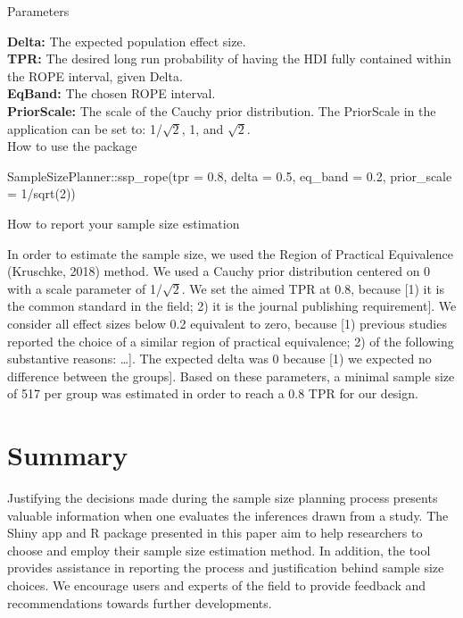 \documentclass[
  english,
  man,floatsintext]{apa6}
\newenvironment{Shaded}{\begin{snugshade}}{\end{snugshade}}
\newcommand{\AttributeTok}[1]{\textcolor[rgb]{0.77,0.63,0.00}{#1}}
\newcommand{\DecValTok}[1]{\textcolor[rgb]{0.00,0.00,0.81}{#1}}
\newcommand{\FloatTok}[1]{\textcolor[rgb]{0.00,0.00,0.81}{#1}}
\newcommand{\FunctionTok}[1]{\textcolor[rgb]{0.00,0.00,0.00}{#1}}
\newcommand{\NormalTok}[1]{#1}
\newcommand{\SpecialCharTok}[1]{\textcolor[rgb]{0.00,0.00,0.00}{#1}}
\begin{document}
Parameters

\textbf{Delta:} The expected population effect size.\\
\textbf{TPR:} The desired long run probability of having the HDI fully contained within the ROPE interval, given Delta.\\
\textbf{EqBand:} The chosen ROPE interval.\\
\textbf{PriorScale:} The scale of the Cauchy prior distribution. The PriorScale in the application can be set to: 1/\(\sqrt{2}\), 1, and \(\sqrt{2}\).\\

How to use the package

\begin{Shaded}
\begin{Highlighting}[]
\NormalTok{SampleSizePlanner}\SpecialCharTok{::}\FunctionTok{ssp\_rope}\NormalTok{(}\AttributeTok{tpr =} \FloatTok{0.8}\NormalTok{, }\AttributeTok{delta =} \FloatTok{0.5}\NormalTok{, }\AttributeTok{eq\_band =} \FloatTok{0.2}\NormalTok{,}
    \AttributeTok{prior\_scale =} \DecValTok{1}\SpecialCharTok{/}\FunctionTok{sqrt}\NormalTok{(}\DecValTok{2}\NormalTok{))}
\end{Highlighting}
\end{Shaded}

How to report your sample size estimation

In order to estimate the sample size, we used the Region of Practical Equivalence (Kruschke, 2018) method. We used a Cauchy prior distribution centered on 0 with a scale parameter of 1/\(\sqrt{2}\). We set the aimed TPR at 0.8, because {[}1) it is the common standard in the field; 2) it is the journal publishing requirement{]}. We consider all effect sizes below 0.2 equivalent to zero, because {[}1) previous studies reported the choice of a similar region of practical equivalence; 2) of the following substantive reasons: \ldots{]}. The expected delta was 0 because {[}1) we expected no difference between the groups{]}. Based on these parameters, a minimal sample size of 517 per group was estimated in order to reach a 0.8 TPR for our design.

\hypertarget{summary}{%
\section{Summary}\label{summary}}

Justifying the decisions made during the sample size planning process presents valuable information when one evaluates the inferences drawn from a study. The Shiny app and R package presented in this paper aim to help researchers to choose and employ their sample size estimation method. In addition, the tool provides assistance in reporting the process and justification behind sample size choices. We encourage users and experts of the field to provide feedback and recommendations towards further developments.
\end{document}
